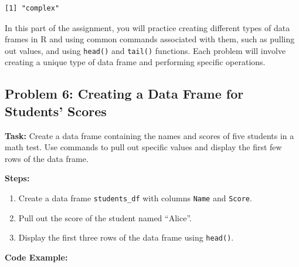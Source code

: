 \documentclass[
  letterpaper,
  DIV=11,
  numbers=noendperiod]{scrreprt}
\newenvironment{Shaded}{\begin{snugshade}}{\end{snugshade}}
\newcommand{\AttributeTok}[1]{\textcolor[rgb]{0.40,0.45,0.13}{#1}}
\newcommand{\CommentTok}[1]{\textcolor[rgb]{0.37,0.37,0.37}{#1}}
\newcommand{\DecValTok}[1]{\textcolor[rgb]{0.68,0.00,0.00}{#1}}
\newcommand{\FunctionTok}[1]{\textcolor[rgb]{0.28,0.35,0.67}{#1}}
\newcommand{\NormalTok}[1]{\textcolor[rgb]{0.00,0.23,0.31}{#1}}
\newcommand{\OtherTok}[1]{\textcolor[rgb]{0.00,0.23,0.31}{#1}}
\newcommand{\SpecialCharTok}[1]{\textcolor[rgb]{0.37,0.37,0.37}{#1}}
\newcommand{\StringTok}[1]{\textcolor[rgb]{0.13,0.47,0.30}{#1}}
\providecommand{\tightlist}{%
  \setlength{\itemsep}{0pt}\setlength{\parskip}{0pt}}\usepackage{longtable,booktabs,array}
\begin{document}
\begin{verbatim}
[1] "complex"
\end{verbatim}

In this part of the assignment, you will practice creating different
types of data frames in R and using common commands associated with
them, such as pulling out values, and using \texttt{head()} and
\texttt{tail()} functions. Each problem will involve creating a unique
type of data frame and performing specific operations.

\subsection*{Problem 6: Creating a Data Frame for Students'
Scores}\label{problem-6-creating-a-data-frame-for-students-scores}

\textbf{Task:} Create a data frame containing the names and scores of
five students in a math test. Use commands to pull out specific values
and display the first few rows of the data frame.

\textbf{Steps:}

\begin{enumerate}
\def\labelenumi{\arabic{enumi}.}
\tightlist
\item
  Create a data frame \texttt{students\_df} with columns \texttt{Name}
  and \texttt{Score}.
\item
  Pull out the score of the student named ``Alice''.
\item
  Display the first three rows of the data frame using \texttt{head()}.
\end{enumerate}

\textbf{Code Example:}

\begin{Shaded}
\end{Shaded}
\end{document}
